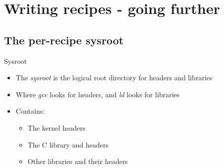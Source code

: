 \section{Writing recipes - going further}

\subsection{The per-recipe sysroot}

\begin{frame}{Sysroot}
  \begin{itemize}
    \item The {\em sysroot} is the logical root directory for headers
      and libraries
    \item Where {\em gcc} looks for headers, and {\em ld} looks for
      libraries
    \item Contains:
      \begin{itemize}
        \item The kernel headers
        \item The C library and headers
        \item Other libraries and their headers
      \end{itemize}
  \end{itemize}
\end{frame}


